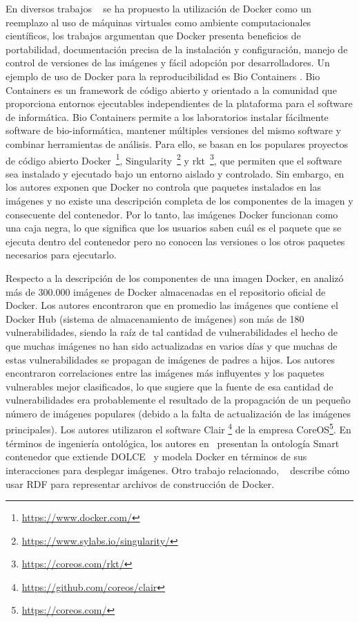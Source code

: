 En diversos trabajos ~\cite{DBLP:journals/bioinformatics/LeprevostGARUBV17, Beaulieu2017, Boettiger:2015:IDR:2723872.2723882, aranguren2015enhanced} se ha propuesto la utilización de Docker como un reemplazo al uso de máquinas virtuales como ambiente computacionales científicos, los trabajos argumentan que Docker presenta beneficios de portabilidad, documentación precisa de la instalación y configuración, manejo de control de versiones de las imágenes y fácil adopción por desarrolladores. 
Un ejemplo de uso de Docker para la reproducibilidad es Bio Containers \cite{DBLP:journals/bioinformatics/LeprevostGARUBV17}. Bio Containers es un framework de código abierto y orientado a la comunidad que proporciona entornos ejecutables independientes de la plataforma para el software de informática.
Bio Containers permite a los laboratorios instalar fácilmente software de bio-informática, mantener múltiples versiones del mismo software y combinar herramientas de análisis. 
Para ello, se basan en los populares proyectos de código abierto Docker~\footnote{\url{https://www.docker.com/}}, Singularity~\footnote{\url{https://www.sylabs.io/singularity/}} y rkt~\footnote{\url{https://coreos.com/rkt/}}, que permiten que el software sea instalado y ejecutado bajo un entorno aislado y controlado.
Sin embargo, en \cite{Boettiger:2015:IDR:2723872.2723882,DBLP:conf/semweb/OsorioAV18} los autores exponen que Docker no controla que paquetes instalados en las imágenes y no existe una descripción completa de los componentes de la imagen y consecuente del contenedor.
Por lo tanto, las imágenes Docker funcionan como una caja negra, lo que significa que los usuarios saben cuál es el paquete que se ejecuta dentro del contenedor pero no conocen las versiones o los otros paquetes necesarios para ejecutarlo.

Respecto a la descripción de los componentes de una imagen Docker, en \cite{Shu:2017:SSV:3029806.3029832:DockerHub:Security} analizó más de 300.000 imágenes de Docker almacenadas en el repositorio oficial de Docker. Los autores encontraron que en promedio las imágenes que contiene el Docker Hub (sistema de almacenamiento de imágenes) son más de 180 vulnerabilidades, siendo la raíz de tal cantidad de vulnerabilidades el hecho de que muchas imágenes no han sido actualizadas en varios días y que muchas de estas vulnerabilidades se propagan de imágenes de padres a hijos. Los autores encontraron correlaciones entre las imágenes más influyentes y los paquetes vulnerables mejor clasificados, lo que sugiere que la fuente de esa cantidad de vulnerabilidades era probablemente el resultado de la propagación de un pequeño número de imágenes populares (debido a la falta de actualización de las imágenes principales). Los autores utilizaron el software Clair \footnote{\url{https://github.com/coreos/clair}} de la empresa CoreOS\footnote{\url{https://coreos.com/}}. 
En términos de ingeniería ontológica, los autores en~\cite{huo2015smart} presentan la ontología Smart contenedor que extiende DOLCE~\cite{gangemi2002sweetening} y modela Docker en términos de sus interacciones para desplegar imágenes. Otro trabajo relacionado, ~\cite{tommasini2017representing}  describe cómo usar RDF para representar archivos de construcción de Docker. 

